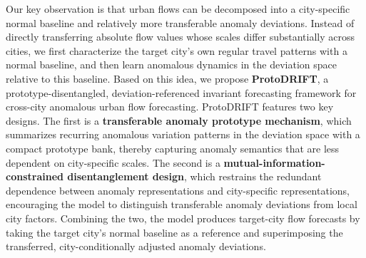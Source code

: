 
Our key observation is that urban flows can be decomposed into a city-specific normal baseline and relatively more transferable anomaly deviations. Instead of directly transferring absolute flow values whose scales differ substantially across cities, we first characterize the target city's own regular travel patterns with a normal baseline, and then learn anomalous dynamics in the deviation space relative to this baseline. Based on this idea, we propose \textbf{ProtoDRIFT}, a prototype-disentangled, deviation-referenced invariant forecasting framework for cross-city anomalous urban flow forecasting. ProtoDRIFT features two key designs. The first is a \textbf{transferable anomaly prototype mechanism}, which summarizes recurring anomalous variation patterns in the deviation space with a compact prototype bank, thereby capturing anomaly semantics that are less dependent on city-specific scales. The second is a \textbf{mutual-information-constrained disentanglement design}, which restrains the redundant dependence between anomaly representations and city-specific representations, encouraging the model to distinguish transferable anomaly deviations from local city factors. Combining the two, the model produces target-city flow forecasts by taking the target city's normal baseline as a reference and superimposing the transferred, city-conditionally adjusted anomaly deviations.




